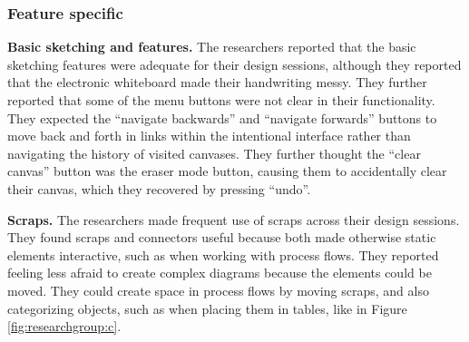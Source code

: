 







\subsubsection{Feature specific}


\textbf{Basic sketching and features.} The researchers reported that the basic sketching features were adequate for their design sessions, although they reported that the electronic whiteboard made their handwriting messy. They further reported that some of the menu buttons were not clear in their functionality. They expected the ``navigate backwards'' and ``navigate forwards'' buttons to move back and forth in links within the intentional interface rather than navigating the history of visited canvases. They further thought the ``clear canvas'' button was the eraser mode button, causing them to accidentally clear their canvas, which they recovered by pressing ``undo''.

\textbf{Scraps.} The researchers made frequent use of scraps across their design sessions. They found scraps and connectors useful because both made otherwise static elements interactive, such as when working with process flows. They reported feeling less afraid to create complex diagrams because the elements could be moved.  They could create space in process flows by moving scraps, and also categorizing objects, such as when placing them in tables, like in Figure \ref{fig:researchgroup:c}. 

